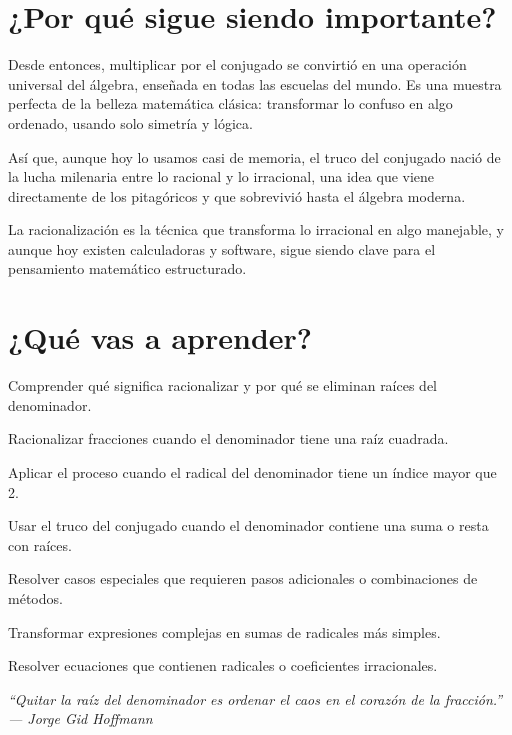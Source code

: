 \section*{¿Por qué sigue siendo importante?}

\begin{reseñaplana}
Desde entonces, multiplicar por el conjugado se convirtió en una operación universal del álgebra, enseñada 
en todas las escuelas del mundo. Es una muestra perfecta de la belleza matemática clásica: transformar lo confuso 
en algo ordenado, usando solo simetría y lógica.

Así que, aunque hoy lo usamos casi de memoria, el truco del conjugado nació de la lucha milenaria entre lo 
racional y lo irracional, una idea que viene directamente de los pitagóricos y que sobrevivió hasta el álgebra moderna.

La racionalización es la técnica que transforma lo irracional en algo manejable, y aunque hoy existen calculadoras 
y software, sigue siendo clave para el pensamiento matemático estructurado.
\end{reseñaplana}

\section*{¿Qué vas a aprender?}
\begin{aprende}
  \item Comprender qué significa racionalizar y por qué se eliminan raíces del denominador.  
  \item Racionalizar fracciones cuando el denominador tiene una raíz cuadrada.  
  \item Aplicar el proceso cuando el radical del denominador tiene un índice mayor que 2.  
  \item Usar el truco del conjugado cuando el denominador contiene una suma o resta con raíces.  
  \item Resolver casos especiales que requieren pasos adicionales o combinaciones de métodos.  
  \item Transformar expresiones complejas en sumas de radicales más simples.  
  \item Resolver ecuaciones que contienen radicales o coeficientes irracionales.  
\end{aprende}

\vspace{1.5cm} %
\begin{flushright}
  {\fontsize{12}{14}\selectfont\itshape
  ``Quitar la raíz del denominador es ordenar el caos en el corazón de la fracción.''\\[6pt]
  — Jorge Gid Hoffmann}%
\end{flushright}